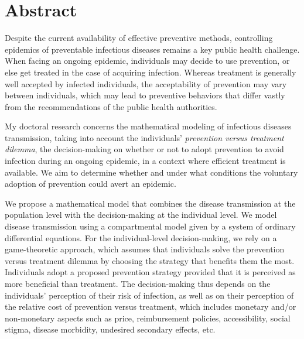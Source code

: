 
\chapter*{\centering \Large \vspace{-3cm}
		Abstract
		\vspace{-0.5cm}}

\small

Despite the current availability of effective preventive methods, controlling epidemics of preventable infectious diseases remains a key public health challenge. When facing an ongoing epidemic, individuals may decide to use prevention, or else get treated in the case of acquiring infection. Whereas treatment is generally well accepted by infected individuals, the acceptability of prevention may vary between individuals, which may lead to preventive behaviors that differ vastly from the recommendations of the public health authorities. 

My doctoral research concerns the mathematical modeling of infectious diseases transmission, taking into account the individuals' {\it prevention versus treatment dilemma}, the decision-making on whether or not to adopt prevention to avoid infection during an ongoing epidemic, in a context where efficient treatment is available. We aim to determine whether and under what conditions the voluntary adoption of prevention could avert an epidemic. 


We propose a mathematical model that combines the disease transmission at the population level with the decision-making at the individual level. We model disease transmission using a compartmental model given by a system of ordinary differential equations. For the individual-level decision-making, we rely on a game-theoretic approach, which assumes that individuals solve the prevention versus treatment dilemma by choosing the strategy that benefits them the most. Individuals adopt a proposed prevention strategy provided that it is perceived as more beneficial than treatment. The decision-making thus depends on the individuals' perception of their risk of infection, as well as on their perception of the relative cost of prevention versus treatment, which includes monetary and/or non-monetary aspects such as price, reimbursement policies, accessibility, social stigma, disease morbidity, undesired secondary effects, etc. 

